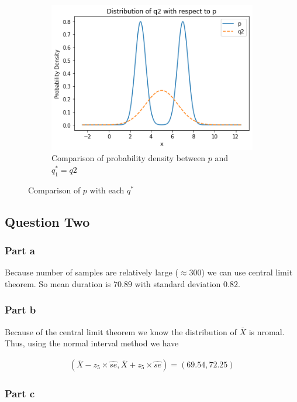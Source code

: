 \documentclass[12pt, a4paper]{book}
\begin{document}
\begin{figure}
\begin{subfigure}{0.5\linewidth}
        \centering
        \includegraphics[width=\linewidth]{image/q1/q2p.png}
        \caption{Comparison of probability density between $p$ and $q_1^*=q2$}
    \end{subfigure}
    \caption{Comparison of $p$ with each $q^*$}
    \label{pq_star}
\end{figure}

\subsection*{Question Two}

\subsubsection*{Part a}

Because number of samples are relatively large ($\approx 300$) we can use central limit theorem.
So mean duration is $70.89$ with standard deviation $0.82$.

\subsubsection*{Part b}

Because of the central limit theorem we know the distribution of $\overline{X}$ is nromal. Thus,
using the normal interval method we have

\begin{eqnarray*}
    (\overline{X} - z_5 \times \hat{se}, \overline{X} + z_5 \times \hat{se}) = (69.54, 72.25)
\end{eqnarray*}

\subsubsection*{Part c}
\end{document}

